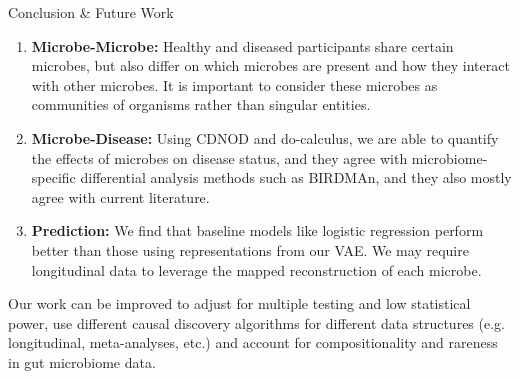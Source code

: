 \documentclass[final]{beamer}
\begin{document}
\begin{frame}[t]
\begin{columns}[t]
\begin{column}{0.65\textwidth}
\begin{columns}[t]
    \begin{column}{0.5\textwidth}
      
      \begin{block}{Conclusion \& Future Work}
    
        \begin{enumerate}
            \item \textbf{Microbe-Microbe:} Healthy and diseased participants share certain microbes, but also differ on which microbes are present and how they interact with other microbes. It is important to consider these microbes as communities of organisms rather than singular entities.      
            \item \textbf{Microbe-Disease:} Using CDNOD and do-calculus, we are able to quantify the effects of microbes on disease status, and they agree with microbiome-specific differential analysis methods such as BIRDMAn, and they also mostly agree with current literature.
            \item \textbf{Prediction:} We find that baseline models like logistic regression perform better than those using representations from our VAE. We may require longitudinal data to leverage the mapped reconstruction of each microbe.
        \end{enumerate}
        
        Our work can be improved to adjust for multiple testing and low statistical power, use different causal discovery algorithms for different data structures (e.g. longitudinal, meta-analyses, etc.) and account for compositionality and rareness in gut microbiome data. 
        

\end{block}
\end{column}
\end{columns}
\end{column}
\end{columns}
\end{frame}
\end{document}
